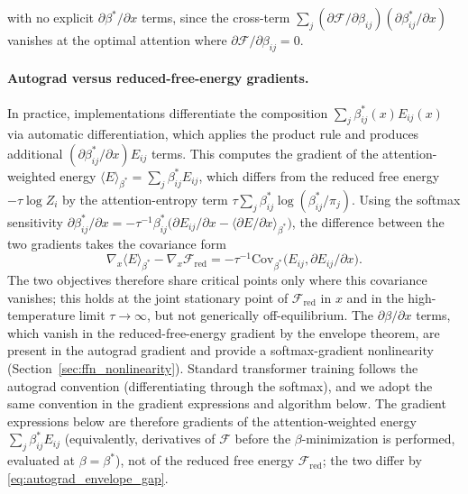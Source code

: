 \documentclass[twoside,11pt]{article}
\begin{document}
with no explicit $\partial\beta^*/\partial x$ terms, since the cross-term $\sum_j(\partial\mathcal{F}/\partial\beta_{ij})(\partial\beta^*_{ij}/\partial x)$ vanishes at the optimal attention where $\partial\mathcal{F}/\partial\beta_{ij} = 0$.

\paragraph{Autograd versus reduced-free-energy gradients.} In practice, implementations differentiate the composition $\sum_j \beta_{ij}^*(x) E_{ij}(x)$ via automatic differentiation, which applies the product rule and produces additional $(\partial\beta_{ij}^*/\partial x) E_{ij}$ terms. This computes the gradient of the attention-weighted energy $\langle E \rangle_{\beta^*} = \sum_j \beta_{ij}^* E_{ij}$, which differs from the reduced free energy $-\tau\log Z_i$ by the attention-entropy term $\tau\sum_j \beta_{ij}^* \log(\beta_{ij}^*/\pi_j)$. Using the softmax sensitivity $\partial \beta_{ij}^*/\partial x = -\tau^{-1}\beta_{ij}^*\big(\partial E_{ij}/\partial x - \langle \partial E/\partial x\rangle_{\beta^*}\big)$, the difference between the two gradients takes the covariance form
\begin{equation}
\nabla_x\langle E\rangle_{\beta^*} - \nabla_x\mathcal{F}_{\mathrm{red}}
= -\tau^{-1} \mathrm{Cov}_{\beta^*} \big(E_{ij}, \partial E_{ij}/\partial x\big).
\label{eq:autograd_envelope_gap}
\end{equation}
The two objectives therefore share critical points only where this covariance vanishes; this holds at the joint stationary point of $\mathcal{F}_{\mathrm{red}}$ in $x$ and in the high-temperature limit $\tau \to \infty$, but not generically off-equilibrium. The $\partial\beta/\partial x$ terms, which vanish in the reduced-free-energy gradient by the envelope theorem, are present in the autograd gradient and provide a softmax-gradient nonlinearity (Section~\ref{sec:ffn_nonlinearity}). Standard transformer training follows the autograd convention (differentiating through the softmax), and we adopt the same convention in the gradient expressions and algorithm below. The gradient expressions below are therefore gradients of the attention-weighted energy $\sum_j\beta_{ij}^* E_{ij}$ (equivalently, derivatives of $\mathcal{F}$ before the $\beta$-minimization is performed, evaluated at $\beta = \beta^*$), not of the reduced free energy $\mathcal{F}_{\mathrm{red}}$; the two differ by \eqref{eq:autograd_envelope_gap}.
\end{document}
